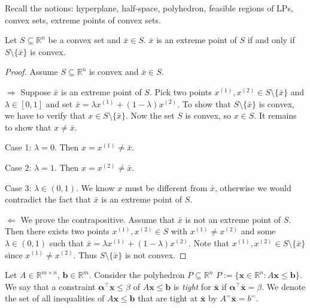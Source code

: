 Recall the notions: hyperplane, half-space, polyhedron,
feasible regions of LPs, convex sets, extreme points
of convex sets.

\begin{thmbox}
    \begin{theorem}
        Let $ S\subseteq \mathbb{R}^n $ be a convex set and $ \bar{x}\in S $.
        $ \bar{x} $ is an extreme point of $ S $ if and only if
        $ S\setminus \{\bar{x}\} $ is convex.
    \end{theorem}
\end{thmbox}
\begin{proof}
    Assume $ S\subseteq\mathbb{R}^n $ is convex and $ \bar{x}\in S $.

    $\Rightarrow$
    Suppose $ \bar{x} $ is an extreme point of $ S $. Pick two points
    $ x^{(1)},x^{(2)}\in S\setminus\{\bar{x}\} $ and $ \lambda\in[0,1] $
    and set $\bar{x}=\lambda x^{(1)} + (1-\lambda)x^{(2)}$. To show
    that $ S\setminus\{\bar{x}\} $ is convex, we have to verify that $ x\in S\setminus\{\bar{x}\} $.
    Now the set $ S $ is convex, so $ x\in S $. It remains to show that
    $ x\neq \bar{x} $.

    Case 1: $ \lambda =0 $. Then $ x=x^{(1)}\neq \bar{x} $.

    Case 2: $ \lambda =1 $. Then $ x=x^{(2)}\neq \bar{x} $.

    Case 3: $ \lambda\in(0,1) $. We know $ x $ must be different from
    $ \bar{x} $, otherwise we would contradict the fact that $ \bar{x} $ is
    an extreme point of $ S $.

    $ \Leftarrow $ We prove the contrapositive. Assume that $ \bar{x} $
    is not an extreme point of $ S $. Then there exists two points
    $ x^{(1)},x^{(2)}\in S $ with $ x^{(1)}\neq x^{(2)} $ and some
    $ \lambda\in(0,1) $ such that $\bar{x}=\lambda x^{(1)} + (1-\lambda)x^{(2)}$.
    Note that $ x^{(1)},x^{(2)}\in S\setminus\{\bar{x}\}$ since
    $ x^{(1)}\neq x^{(2)} $. Thus $ S\setminus\{\bar{x}\} $ is not convex.
\end{proof}

\begin{defbox}
    \begin{definition}
        Let $ A\in \mathbb{R}^{m \times n} $, $ \bm{b}\in \mathbb{R}^m $. Consider
        the polyhedron $ P\subseteq \mathbb{R}^n $
        $ P:=\{\bm{x}\in\mathbb{R}^n:A\bm{x}\leqslant \bm{b}\} $. We say
        that a constraint $ \bm{\alpha ^\top} \bm{x}\leqslant \beta $ of
        $ A \bm{x}\leqslant \bm{b} $ is \emph{tight} for $ \bm{\bar{x}} $ if
        $ \bm{\alpha}^\top \bm{\bar{x}}=\beta $. We denote the set of all
        inequalities of $ A \bm{x}\leqslant \bm{b} $ that
        are tight at $ \bm{\bar{x}} $ by $ A^=\bm{\bar{x}}=b^= $.
    \end{definition}
\end{defbox}

